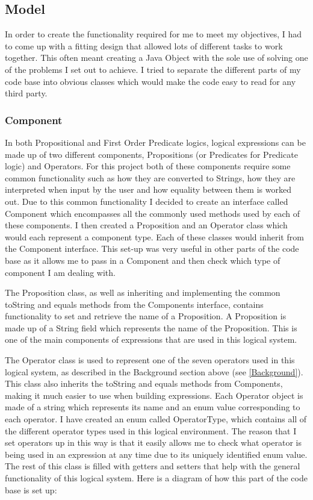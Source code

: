 \subsection{Model}
In order to create the functionality required for me to meet my objectives, I had to come up with a fitting design that allowed lots of different tasks to work together. This often meant creating a Java Object with the sole use of solving one of the problems I set out to achieve. I tried to separate the different parts of my code base into obvious classes which would make the code easy to read for any third party.

\subsubsection{Component}
In both Propositional and First Order Predicate logics, logical expressions can be made up of two different components, Propositions (or Predicates for Predicate logic) and Operators. For this project both of these components require some common functionality such as how they are converted to Strings, how they are interpreted when input by the user and how equality between them is worked out. Due to this common functionality I decided to create an interface called Component which encompasses all the commonly used methods used by each of these components. I then created a Proposition and an Operator class which would each represent a component type. Each of these classes would inherit from the Component interface. This set-up was very useful in other parts of the code base as it allows me to pass in a Component and then check which type of component I am dealing with.  

The Proposition class, as well as inheriting and implementing the common toString and equals methods from the Components interface, contains functionality to set and retrieve the name of a Proposition. A Proposition is made up of a String field which represents the name of the Proposition. This is one of the main components of expressions that are used in this logical system.

The Operator class is used to represent one of the seven operators used in this logical system, as described in the Background section above (see \ref{Background}). This class also inherits the toString and equals methods from Components, making it much easier to use when building expressions. Each Operator object is made of a string which represents its name and an enum value corresponding to each operator. I have created an enum called OperatorType, which contains all of the different operator types used in this logical environment. The reason that I set operators up in this way is that it easily allows me to check what operator is being used in an expression at any time due to its uniquely identified enum value. The rest of this class is filled with getters and setters that help with the general functionality of this logical system. Here is a diagram of how this part of the code base is set up:

